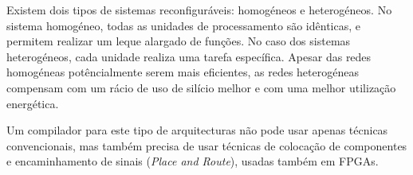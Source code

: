 Existem dois tipos de sistemas reconfiguráveis: homogéneos e heterogéneos. No sistema homogéneo, todas as unidades de processamento são idênticas\cite{Ebeling96}, e permitem realizar um leque alargado de funções. No caso dos sistemas heterogéneos, cada unidade realiza uma tarefa específica\cite{Heysters03}. Apesar das redes homogéneas potêncialmente serem mais eficientes, as redes heterogéneas compensam com um rácio de uso de silício melhor e com uma melhor utilização energética\cite{Park12}. 
                          
Um compilador para este tipo de arquitecturas não pode usar apenas técnicas convencionais, mas também precisa de usar técnicas de colocação de componentes e encaminhamento de sinais ({\it Place and Route}), usadas também em FPGAs\cite{Betz99}.  
                          

\cleardoublepage






